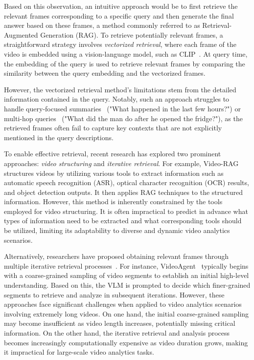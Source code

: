 Based on this observation, an intuitive approach would be to first retrieve the relevant frames corresponding to a specific query and then generate the final answer based on these frames, a method commonly referred to as Retrieval-Augmented Generation (RAG). To retrieve potentially relevant frames, a straightforward strategy involves \emph{vectorized retrieval}, where each frame of the video is embedded using a vision-language model, such as CLIP~\cite{radford2021CLIP}. At query time, the embedding of the query is used to retrieve relevant frames by comparing the similarity between the query embedding and the vectorized frames. 

However, the vectorized retrieval method's limitations stem from the detailed information contained in the query. Notably, such an approach struggles to handle query-focused summaries~\cite{edge2024graphrag} (\eg "What happened in the last few hours?") or multi-hop queries~\cite{zhao2024retrieval} (\eg "What did the man do after he opened the fridge?"), as the retrieved frames often fail to capture key contexts that are not explicitly mentioned in the query descriptions.


To enable effective retrieval, recent research has explored two prominent approaches: \emph{video structuring} and \emph{iterative retrieval}. For example, Video-RAG~\cite{luo2024video-rag} structures videos by utilizing various tools to extract information such as automatic speech recognition (ASR), optical character recognition (OCR) results, and object detection outputs. It then applies RAG techniques to the structured information. However, this method is inherently constrained by the tools employed for video structuring. It is often impractical to predict in advance what types of information need to be extracted and what corresponding tools should be utilized, limiting its adaptability to diverse and dynamic video analytics scenarios.

Alternatively, researchers have proposed obtaining relevant frames through multiple iterative retrieval processes~\cite{wang2024videoagent, wang2024videotree, ma2024drvideo, yang2024vca}. For instance, VideoAgent~\cite{wang2024videoagent} typically begins with a coarse-grained sampling of video segments to establish an initial high-level understanding. Based on this, the VLM is prompted to decide which finer-grained segments to retrieve and analyze in subsequent iterations.  However, these approaches face significant challenges when applied to video analytics scenarios involving extremely long videos. On one hand, the initial coarse-grained sampling may become insufficient as video length increases, potentially missing critical information. On the other hand, the iterative retrieval and analysis process becomes increasingly computationally expensive as video duration grows, making it impractical for large-scale video analytics tasks.


